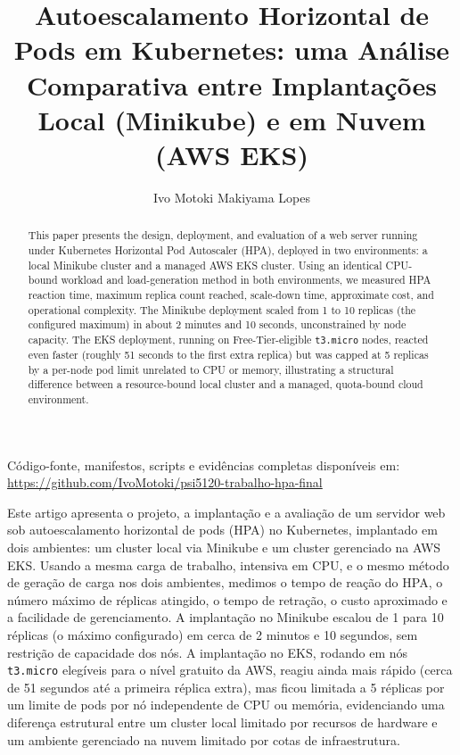 \documentclass[12pt]{article}
\title{Autoescalamento Horizontal de Pods em Kubernetes: uma Análise
  Comparativa entre Implantações Local (Minikube) e em Nuvem (AWS EKS)}
\author{Ivo Motoki Makiyama Lopes\inst{1}}
\begin{document}
\maketitle

\begin{center}
\footnotesize Código-fonte, manifestos, scripts e evidências completas
disponíveis em: \url{https://github.com/IvoMotoki/psi5120-trabalho-hpa-final}
\end{center}

\begin{abstract}
  This paper presents the design, deployment, and evaluation of a web server
  running under Kubernetes Horizontal Pod Autoscaler (HPA), deployed in two
  environments: a local Minikube cluster and a managed AWS EKS cluster. Using
  an identical CPU-bound workload and load-generation method in both
  environments, we measured HPA reaction time, maximum replica count reached,
  scale-down time, approximate cost, and operational complexity. The Minikube
  deployment scaled from 1 to 10 replicas (the configured maximum) in about 2
  minutes and 10 seconds, unconstrained by node capacity. The EKS deployment,
  running on Free-Tier-eligible \texttt{t3.micro} nodes, reacted even faster
  (roughly 51 seconds to the first extra replica) but was capped at 5
  replicas by a per-node pod limit unrelated to CPU or memory, illustrating a
  structural difference between a resource-bound local cluster and a
  managed, quota-bound cloud environment.
\end{abstract}

\begin{resumo}
  Este artigo apresenta o projeto, a implantação e a avaliação de um servidor
  web sob autoescalamento horizontal de pods (HPA) no Kubernetes, implantado
  em dois ambientes: um cluster local via Minikube e um cluster gerenciado na
  AWS EKS. Usando a mesma carga de trabalho, intensiva em CPU, e o mesmo
  método de geração de carga nos dois ambientes, medimos o tempo de reação do
  HPA, o número máximo de réplicas atingido, o tempo de retração, o custo
  aproximado e a facilidade de gerenciamento. A implantação no Minikube
  escalou de 1 para 10 réplicas (o máximo configurado) em cerca de 2 minutos
  e 10 segundos, sem restrição de capacidade dos nós. A implantação no EKS,
  rodando em nós \texttt{t3.micro} elegíveis para o nível gratuito da AWS,
  reagiu ainda mais rápido (cerca de 51 segundos até a primeira réplica
  extra), mas ficou limitada a 5 réplicas por um limite de pods por nó
  independente de CPU ou memória, evidenciando uma diferença estrutural
  entre um cluster local limitado por recursos de hardware e um ambiente
  gerenciado na nuvem limitado por cotas de infraestrutura.
\end{resumo}
\end{document}
